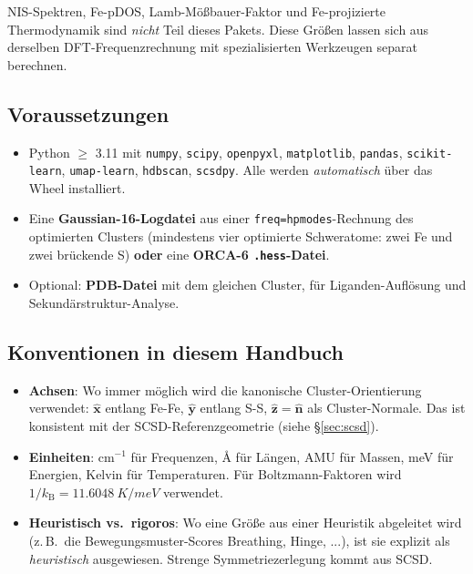 \documentclass[11pt,a4paper,twoside]{article}
\newcommand{\nhat}{\hat{\mathbf{n}}}
\newcommand{\xhat}{\hat{\mathbf{x}}}
\newcommand{\yhat}{\hat{\mathbf{y}}}
\newcommand{\zhat}{\hat{\mathbf{z}}}
\newcommand{\kB}{k_{\mathrm{B}}}
\theoremstyle{remark}
\begin{document}
NIS-Spektren, Fe-pDOS, Lamb-M\"o\ss bauer-Faktor und
Fe-projizierte Thermodynamik sind \emph{nicht} Teil dieses Pakets.
Diese Gr\"o\ss en lassen sich aus derselben DFT-Frequenzrechnung mit
spezialisierten Werkzeugen separat berechnen.

\subsection{Voraussetzungen}

\begin{itemize}
  \item Python $\geq$ 3.11 mit \texttt{numpy}, \texttt{scipy},
        \texttt{openpyxl}, \texttt{matplotlib}, \texttt{pandas},
        \texttt{scikit-learn}, \texttt{umap-learn}, \texttt{hdbscan},
        \texttt{scsdpy}. Alle werden \emph{automatisch} \"uber das
        Wheel installiert.
  \item Eine \textbf{Gaussian-16-Logdatei} aus einer
        \texttt{freq=hpmodes}-Rechnung des optimierten Clusters
        (mindestens vier optimierte Schweratome: zwei Fe und zwei
        br\"uckende S) \textbf{oder} eine \textbf{ORCA-6
        \texttt{.hess}-Datei}.
  \item Optional: \textbf{PDB-Datei} mit dem gleichen Cluster, f\"ur
        Liganden-Aufl\"osung und Sekund\"arstruktur-Analyse.
\end{itemize}

\subsection{Konventionen in diesem Handbuch}

\begin{itemize}
  \item \textbf{Achsen}: Wo immer m\"oglich wird die kanonische
        Cluster-Orientierung verwendet:
        $\xhat$ entlang Fe-Fe, $\yhat$ entlang S-S,
        $\zhat = \nhat$ als Cluster-Normale. Das ist konsistent mit
        der SCSD-Referenzgeometrie (siehe \S\ref{sec:scsd}).
  \item \textbf{Einheiten}: cm$^{-1}$ f\"ur Frequenzen,
        \AA{} f\"ur L\"angen, AMU f\"ur Massen, meV f\"ur Energien,
        Kelvin f\"ur Temperaturen. F\"ur Boltzmann-Faktoren wird
        $1/\kB = \SI{11.6048}{K/meV}$ verwendet.
  \item \textbf{Heuristisch vs.\ rigoros}: Wo eine Gr\"o\ss e aus
        einer Heuristik abgeleitet wird (z.\,B.\ die
        Bewegungsmuster-Scores Breathing, Hinge, ...), ist sie
        explizit als \emph{heuristisch} ausgewiesen. Strenge
        Symmetriezerlegung kommt aus SCSD.
\end{itemize}
\end{document}
